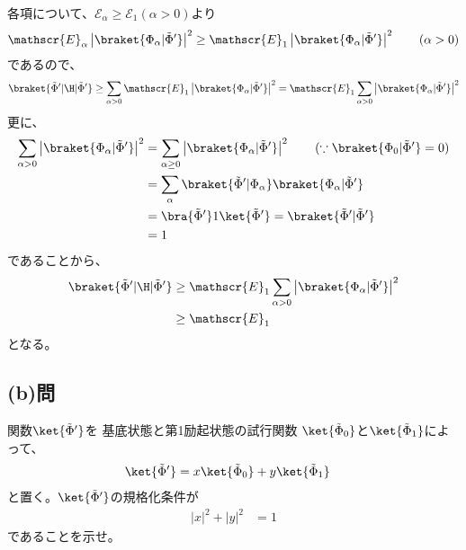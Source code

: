 各項について、$\mathscr{E}_{\alpha}\geq\mathscr{E}_{1}(\alpha>0)$より
\begin{align}
	\mathscr{E}_{\alpha}
		\left|\braket{\Phi_{\alpha}|\tilde{\Phi}'}\right|^2
\geq
	\mathscr{E}_{1}
		\left|\braket{\Phi_{\alpha}|\tilde{\Phi}'}\right|^2
	\qquad
	(\alpha>0)
\end{align}
であるので、
\begin{align}
	\braket{\tilde{\Phi}'|\H|\tilde{\Phi}'}
\geq
	\sum_{\alpha>0}
		\mathscr{E}_{1}
			\left|
				\braket{\Phi_{\alpha}|\tilde{\Phi}'}
			\right|^2
=
	\mathscr{E}_{1}
		\sum_{\alpha>0}
			\left|
				\braket{\Phi_{\alpha}|\tilde{\Phi}'}
			\right|^2
\end{align}
更に、
\begin{align}
	\sum_{\alpha>0}
		\left|
			\braket{\Phi_{\alpha}|\tilde{\Phi}'}
		\right|^2
&=
	\sum_{\alpha\geq 0}
		\left|
			\braket{\Phi_{\alpha}|\tilde{\Phi}'}
		\right|^2
	\qquad
	(\because\braket{\Phi_{0}|\tilde{\Phi}'}=0) \\
%
%
&=
	\sum_{\alpha}
		\braket{\tilde{\Phi}'|\Phi_{\alpha}}
			\braket{\Phi_{\alpha}|\tilde{\Phi}'} \\
%
%
&=
	\bra{\tilde{\Phi}'} 1 \ket{\tilde{\Phi}'}
=
	\braket{\tilde{\Phi}'|\tilde{\Phi}'} \\
%
%
&=
	1
\end{align}
であることから、
\begin{align}
	\braket{\tilde{\Phi}'|\H|\tilde{\Phi}'}
&\geq
	\mathscr{E}_1
		\sum_{\alpha>0}
			\left|
				\braket{\Phi_{\alpha}|\tilde{\Phi}'}
			\right|^2 \\
%
%
&\geq
	\mathscr{E}_1
\end{align}
となる。


\subsection{(b)問}
関数$\ket{\tilde{\Phi}'}$を
基底状態と第1励起状態の試行関数
$\ket{\tilde{\Phi}_0}$と$\ket{\tilde{\Phi}_1}$によって、
\begin{align}
	\ket{\tilde{\Phi}'}
&=
	x \ket{\tilde{\Phi}_0}
	+
	y \ket{\tilde{\Phi}_1}
\end{align}
と置く。$\ket{\tilde{\Phi}'}$の規格化条件が
\begin{align}
	|x|^2
	+
	|y|^2
&=
	1
\end{align}
であることを示せ。

